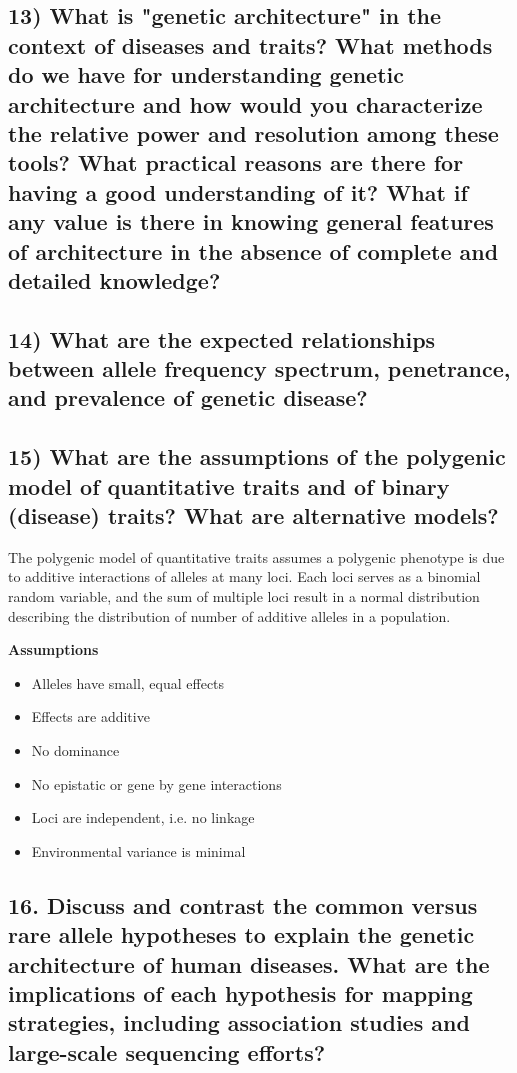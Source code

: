 \documentclass{tufte-handout}
\theoremstyle{noparens}
\begin{document}
\subsection{13) What is "genetic architecture" in the context of diseases and traits? What methods do we have for understanding genetic architecture and how would you characterize the relative power and resolution among these tools? What practical reasons are there for having a good understanding of it? What if any value is there in knowing general features of architecture in the absence of complete and detailed knowledge?}

\subsection{14) What are the expected relationships between allele frequency spectrum, penetrance, and prevalence of genetic disease?}

\newpage
\subsection{15) What are the assumptions of the polygenic model of quantitative traits and of binary (disease) traits? What are alternative models?}

The polygenic model of quantitative traits assumes a polygenic phenotype is due to additive interactions of alleles at many loci. Each loci serves as a binomial random variable, and the sum of multiple loci result in a normal distribution describing the distribution of number of additive alleles in a population.

\textbf{Assumptions}

\begin{itemize}
\item Alleles have small, equal effects
\item Effects are additive
\item No dominance
\item No epistatic or gene by gene interactions
\item Loci are independent, i.e. no linkage
\item Environmental variance is minimal
\end{itemize}

\newpage
\subsection{16. Discuss and contrast the common versus rare allele hypotheses to explain the genetic architecture of human diseases. What are the implications of each hypothesis for mapping strategies, including association studies and large-scale sequencing efforts?}
\end{document}
